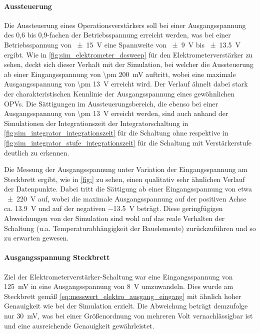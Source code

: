 \documentclass[12pt,english,ngerman]{scrartcl}
\begin{document}
\paragraph{Aussteuerung}
Die Aussteuerung eines Operationsverstärkers soll bei einer Ausgangsspannung
des 0,6 bis 0,9-fachen der Betriebsspannung erreicht werden, was bei einer
Betriebsspannung von \SI{\pm 15}{\volt} eine Spannweite von \SI{\pm 9}{\volt}
bis \SI{\pm 13,5}{\volt} ergibt. Wie in \autoref{fig:sim_elektrometer_dcsweep}
für den Elektrometerverstärker zu sehen, deckt sich dieser Verhalt mit der
Simulation, bei welcher die Aussteuerung ab einer Eingangsspannung von \SI{\pm
200}{\milli\volt} auftritt, wobei eine maximale Ausgangsspannung von \SI{\pm
13}{\volt} erreicht wird. Der Verlauf ähnelt dabei stark der charakteristischen
Kennlinie der Ausgangsspannung eines gewöhnlichen OPVs. Die Sättigungen im
Aussteuerungsbereich, die ebenso bei einer Ausgangsspannung von \SI{\pm
13}{\volt} erreicht werden, sind auch anhand der Simulationen der
Integrationszeit der Integratorschaltung in
\autoref{fig:sim_integrator_integrationszeit} für die Schaltung ohne respektive
in \autoref{fig:sim_integrator_stufe_integrationszeit} für die Schaltung mit
Verstärkerstufe deutlich zu erkennen. 

Die Messung der Ausgangsspannung unter Variation der Eingangsspannung am
Steckbrett ergibt, wie in \autoref{fig:} zu sehen, 
einen qualitativ sehr ähnlichen Verlauf der Datenpunkte. 
Dabei tritt die Sättigung ab einer Eingangsspannung von etwa \SI{\pm 220}{\volt} 
auf, wobei die maximale Ausgangsspannung auf der positiven Achse
ca. \SI{13,9}{\volt} und auf der negativen \SI{-13,5}{\volt} beträgt. Diese
geringfügigen Abweichungen von der Simulation sind wohl auf das reale Verhalten
der Schaltung (u.a. Temperaturabhängigkeit der Bauelemente) zurückzuführen und
so zu erwarten gewesen.

\paragraph{Ausgangsspannung Steckbrett}
Ziel der Elektrometerverstärker-Schaltung war eine Eingangsspannung von
\SI{125}{\milli\volt} in eine Ausgangsspannung von \SI{8}{\volt} umzuwandeln.
Dies wurde am Steckbrett gemäß \autoref{eq:messwert_elektro_ausgang_eingang}
mit ähnlich hoher Genauigkeit wie bei der Simulation erzielt. Die Abweichung
beträgt demzufolge nur \SI{30}{\milli\volt}, was bei einer Größenordnung von
mehreren Volt vernachlässigbar ist und eine ausreichende Genauigkeit
gewährleistet.
\end{document}
